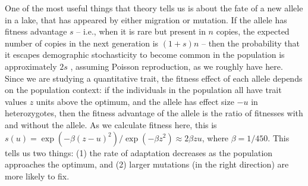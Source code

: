 \documentclass{article}
\begin{document}
One of the most useful things that theory tells us is about
the fate of a new allele in a lake, that has appeared by either migration or mutation. 
If the allele has fitness advantage $s$ -- 
i.e., when it is rare but present in $n$ copies,
the expected number of copies in the next generation is $(1+s)n$ --
then the probability that it escapes demographic stochasticity to become common in the population 
is approximately $2s$ \citep{lambert2006probability,haldane1927mathematical} 
, assuming Poisson reproduction, as we roughly have here. 
Since we are studying a quantitative trait, the fitness effect of each allele
depends on the population context:
if the individuals in the population all have trait values $z$ units above the optimum,
and the allele has effect size $-u$ in heterozygotes,
then the fitness advantage of the allele is the ratio of fitnesses with and without the allele.
As we calculate fitness here, this is
$s(u) = \exp(-\beta(z - u)^2) / \exp( - \beta z^2) \approx 2 \beta z u$,
where $\beta = 1 / 450$. 
This tells us two things: (1) the rate of adaptation decreases as the population approaches the optimum, and (2) larger mutations (in the right direction) are more likely to fix.
\end{document}

